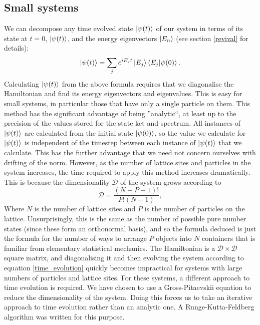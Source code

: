 \documentclass[a4paper,10pt]{article}
\begin{document}
\subsection{Small systems}
We can decompose any time evolved state $\ket{\psi(t)}$ of our system in terms of its state at $t=0$, $\ket{\psi(t)}$, and the energy eigenvectors $\ket{E_n}$ (see section \ref{revival}
for details):
\begin{equation}
  \ket{\psi(t)}=\sum_je^{iE_{j}t}\ket{E_j}\braket{E_j|\psi(0)}.
\end{equation}
Calculating $\ket{\psi(t)}$ from the above formula requires that we diagonalise the Hamiltonian and find its energy eigenvectors and eigenvalues. This is easy for small systems, in particular
those that have only a single particle on them. This method has the significant advantage of being ''analytic``, at least up to the precision of the values stored for the state ket and spectrum.
 All instances of $\ket{\psi(t)}$ are calculated from the initial state $\ket{\psi(0)}$, so the value we calculate for $\ket{\psi(t)}$ is independent of the timestep between each instance of $\ket{\psi(t)}$ that we calculate. This has the further advantage that we need 
not concern ourselves with drifting of the norm. However, as the number of lattice sites and particles in the system increases, the time required to apply this method increases
dramatically. This is because the dimensionality $\mathcal{D}$ of the system grows according to
\begin{equation}
 \mathcal{D}=\frac{\left(N+P-1\right)!}{P!\left(N-1\right)}, \label{time_evolution}
\end{equation}
Where $N$ is the number of lattice sites and $P$ is the number of particles on the lattice. Unsurprisingly, this is the same as the number of possible pure number states (since these form
an orthonormal basis), and so the formula deduced is just the formula for the number of ways to arrange $P$ objects into $N$ containers that is familiar from elementary statistical mechanics.
The Hamiltonian is a $\mathcal{D}\times\mathcal{D}$ square matrix, and diagonalising it and then evolving the system according to equation \ref{time_evolution} quickly becomes impractical 
for systems with large numbers of particles and lattice sites. For these systems, a different approach to time evolution is required. We have chosen to use a Gross-Pitaevskii equation to reduce
the dimensionality of the system. Doing this forces us to take an iterative approach to time evolution rather than an analytic one. A Runge-Kutta-Feldberg algorithm was written for this purpose.
\end{document}
